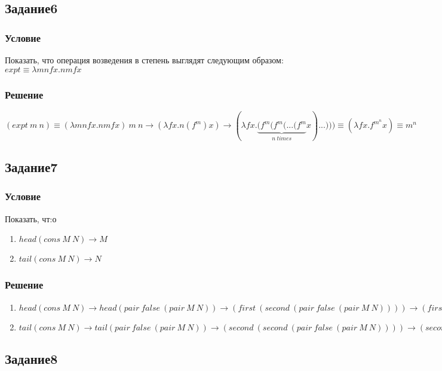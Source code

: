 \documentclass[10pt,a4paper]{article}
\begin{document}
\subsection*{Задание6}
\subsubsection*{Условие}
Показать, что операция возведения в степень выглядят
следующим образом:\\
$expt \equiv \lambda mnfx.nmfx$
\subsubsection*{Решение}
$
(expt\ m\ n) \equiv (\lambda mnfx.nmfx)\ m \ n \rightarrow 
(\lambda fx.n(f^m)x) \rightarrow 
(\lambda fx.\underbrace{(f^m(f^m(... (f^m}_{n\ times} x)...)))  \equiv
(\lambda fx.f^{m^n}x)
\equiv m^n
$

\subsection*{Задание7}
\subsubsection*{Условие}
Показать, чт:о
\begin{enumerate}
\item $head(cons\ M\ N) \longrightarrow M$ 
\item $tail(cons\ M\ N) \longrightarrow N$ 
\end{enumerate}
\subsubsection*{Решение}
\begin{enumerate}
\item
 $head(cons\ M\ N) \longrightarrow head(pair\ false\ (pair\ M\
 N)) \longrightarrow (first\ (second\ (pair\ false\ (pair\ M\
 N)))) \longrightarrow (first\ (second\ (pair\ false\ (pair\ M\
 N)))) \longrightarrow (first\ (pair\ M\
 N)) \longrightarrow M $
\item
 $tail(cons\ M\ N) \longrightarrow tail(pair\ false\ (pair\ M\
 N)) \longrightarrow (second\ (second\ (pair\ false\ (pair\ M\
 N)))) \longrightarrow (second\ (second\ (pair\ false\ (pair\ M\
 N)))) \longrightarrow (second\ (pair\ M\
 N)) \longrightarrow M$ 
\end{enumerate}

\subsection*{Задание8}
\end{document}
